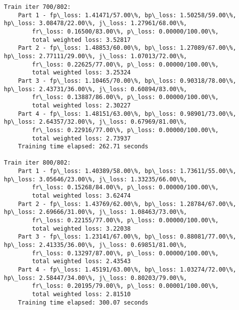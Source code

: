 \documentclass[11pt]{article}
\begin{document}
\begin{Verbatim}[commandchars=\\\{\}]
Train iter 700/802:
	Part 1 - fp\_loss: 1.41471/57.00\%, bp\_loss: 1.50258/59.00\%, hp\_loss: 3.08478/22.00\%, j\_loss: 1.27961/68.00\%, 
		fr\_loss: 0.16500/83.00\%, p\_loss: 0.00000/100.00\%, 
		total weighted loss: 3.52817
	Part 2 - fp\_loss: 1.48853/60.00\%, bp\_loss: 1.27089/67.00\%, hp\_loss: 2.77111/29.00\%, j\_loss: 1.07013/72.00\%, 
		fr\_loss: 0.22625/77.00\%, p\_loss: 0.00000/100.00\%, 
		total weighted loss: 3.25324
	Part 3 - fp\_loss: 1.10465/70.00\%, bp\_loss: 0.90318/78.00\%, hp\_loss: 2.43731/36.00\%, j\_loss: 0.60894/83.00\%, 
		fr\_loss: 0.13887/86.00\%, p\_loss: 0.00000/100.00\%, 
		total weighted loss: 2.30227
	Part 4 - fp\_loss: 1.48151/63.00\%, bp\_loss: 0.98901/73.00\%, hp\_loss: 2.64357/32.00\%, j\_loss: 0.67969/81.00\%, 
		fr\_loss: 0.22916/77.00\%, p\_loss: 0.00000/100.00\%, 
		total weighted loss: 2.73937
	Training time elapsed: 262.71 seconds

Train iter 800/802:
	Part 1 - fp\_loss: 1.40389/58.00\%, bp\_loss: 1.73611/55.00\%, hp\_loss: 3.05646/23.00\%, j\_loss: 1.33235/66.00\%, 
		fr\_loss: 0.15268/84.00\%, p\_loss: 0.00000/100.00\%, 
		total weighted loss: 3.62474
	Part 2 - fp\_loss: 1.43769/62.00\%, bp\_loss: 1.28784/67.00\%, hp\_loss: 2.69666/31.00\%, j\_loss: 1.08463/73.00\%, 
		fr\_loss: 0.22155/77.00\%, p\_loss: 0.00000/100.00\%, 
		total weighted loss: 3.22038
	Part 3 - fp\_loss: 1.23141/67.00\%, bp\_loss: 0.88081/77.00\%, hp\_loss: 2.41335/36.00\%, j\_loss: 0.69851/81.00\%, 
		fr\_loss: 0.13297/87.00\%, p\_loss: 0.00000/100.00\%, 
		total weighted loss: 2.43543
	Part 4 - fp\_loss: 1.45191/63.00\%, bp\_loss: 1.03274/72.00\%, hp\_loss: 2.58447/34.00\%, j\_loss: 0.80203/79.00\%, 
		fr\_loss: 0.20195/79.00\%, p\_loss: 0.00001/100.00\%, 
		total weighted loss: 2.81510
	Training time elapsed: 300.07 seconds


\end{Verbatim}
\end{document}
